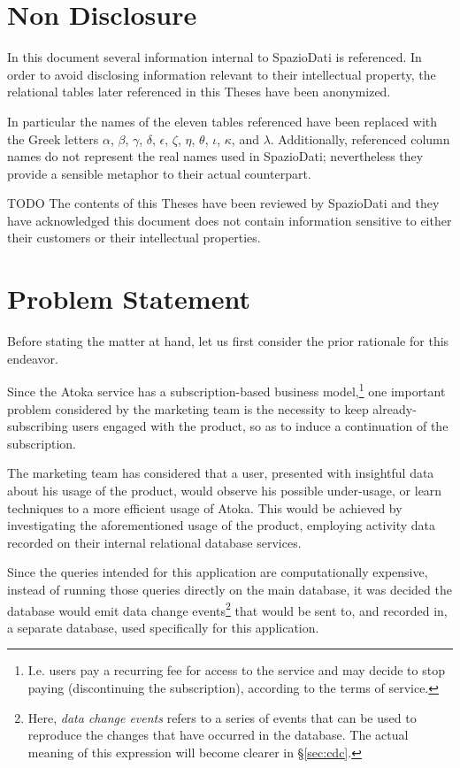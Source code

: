 \section{Non Disclosure}
\label{sec:non-disclosure}

In this document several information internal to SpazioDati is referenced.
In order to avoid disclosing information relevant to their intellectual property, the relational tables later referenced in this Theses have been anonymized.

In particular the names of the eleven tables referenced have been replaced with the Greek letters $\alpha$, $\beta$, $\gamma$, $\delta$, $\epsilon$, $\zeta$, $\eta$, $\theta$, $\iota$, $\kappa$, and $\lambda$.
Additionally, referenced column names do not represent the real names used in SpazioDati; nevertheless they provide a sensible metaphor to their actual counterpart. 

TODO
The contents of this Theses have been reviewed by SpazioDati and they have acknowledged this document does not contain information sensitive to either their customers or their intellectual properties.


\section{Problem Statement}
\label{sec:problem-statement}

Before stating the matter at hand, let us first consider the prior rationale for this endeavor.

Since the Atoka service has a subscription-based business model,\footnote{%
I.e. users pay a recurring fee for access to the service and may decide to stop paying (discontinuing the subscription), according to the terms of service.
} one important problem considered by the marketing team is the necessity to keep already-subscribing users engaged with the product, so as to induce a continuation of the subscription.

The marketing team has considered that a user, presented with insightful data about his usage of the product, would observe his possible under-usage, or learn techniques to a more efficient usage of Atoka.
This would be achieved by investigating the aforementioned usage of the product, employing activity data recorded on their internal relational database services.

Since the queries intended for this application are computationally expensive, instead of running those queries directly on the main database, it was decided the database would emit data change events\footnote{%
Here, \emph{data change events} refers to a series of events that can be used to reproduce the changes that have occurred in the database.
The actual meaning of this expression will become clearer in \S \ref{sec:cdc}.
} that would be sent to, and recorded in, a separate database, used specifically for this application.

